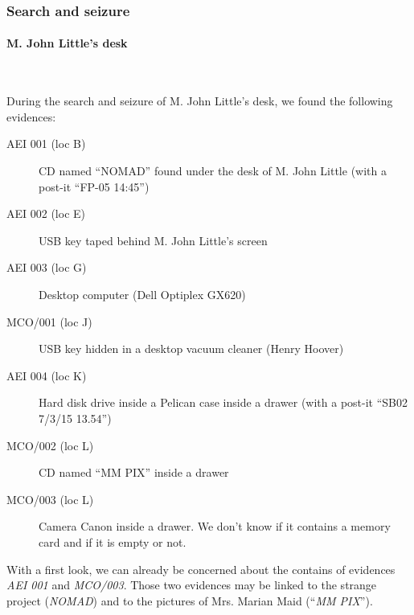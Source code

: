 \subsubsection{Search and seizure}
\paragraph{M. John Little's desk}~\\\par
During the search and seizure of M. John Little's desk, we found the following evidences:
\begin{description}
 \item[AEI 001 (loc B)] CD named \enquote{NOMAD} found under the desk of M. John Little (with a post-it \enquote{FP-05 14:45})
 \item[AEI 002 (loc E)] USB key taped behind M. John Little's screen
 \item[AEI 003 (loc G)] Desktop computer (Dell Optiplex GX620)
 \item[MCO/001 (loc J)] USB key hidden in a desktop vacuum cleaner (Henry Hoover)
 \item[AEI 004 (loc K)] Hard disk drive inside a Pelican case inside a drawer (with a post-it \enquote{SB02 7/3/15 13.54})
 \item[MCO/002 (loc L)] CD named \enquote{MM PIX} inside a drawer
 \item[MCO/003 (loc L)] Camera Canon inside a drawer. We don't know if it contains a memory card and if it is empty or not.
\end{description}
With a first look, we can already be concerned about the contains of evidences \textit{AEI 001} and \textit{MCO/003}. Those two evidences may be linked to the strange project (\textit{NOMAD}) and to the pictures of Mrs. Marian Maid (\enquote{\textit{MM PIX}}).

